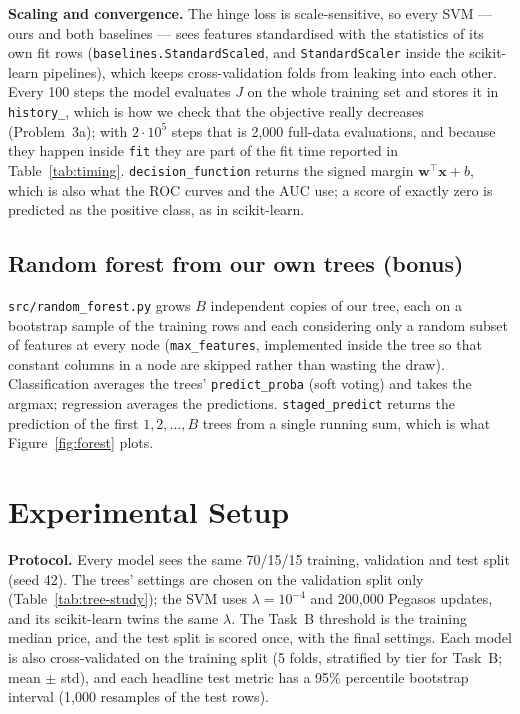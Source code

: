 \documentclass[10pt,twocolumn,a4paper]{article}
\begin{document}
\textbf{Scaling and convergence.} The hinge loss is scale-sensitive, so every
SVM --- ours and both baselines --- sees features standardised with the
statistics of its own fit rows (\texttt{baselines.StandardScaled}, and
\texttt{StandardScaler} inside the scikit-learn pipelines), which keeps
cross-validation folds from leaking into each other. Every 100 steps the model
evaluates $J$ on the whole training set and stores it in \texttt{history\_},
which is how we check that the objective really decreases (Problem~3a); with
$2\cdot10^5$ steps that is 2{,}000 full-data evaluations, and because they
happen inside \texttt{fit} they are part of the fit time reported in
Table~\ref{tab:timing}. \texttt{decision\_function} returns the signed margin
$\mathbf{w}^{\top}\mathbf{x}+b$, which is also what the ROC curves and the AUC
use; a score of exactly zero is predicted as the positive class, as in
scikit-learn.

\subsection{Random forest from our own trees (bonus)}
\texttt{src/random\_forest.py} grows $B$ independent copies of our tree, each
on a bootstrap sample of the training rows and each considering only a random
subset of features at every node (\texttt{max\_features}, implemented inside
the tree so that constant columns in a node are skipped rather than wasting
the draw). Classification averages the trees' \texttt{predict\_proba} (soft
voting) and takes the argmax; regression averages the predictions.
\texttt{staged\_predict} returns the prediction of the first $1,2,\dots,B$
trees from a single running sum, which is what Figure~\ref{fig:forest} plots.

\section{Experimental Setup}
\label{sec:setup}
\textbf{Protocol.} Every model sees the same 70/15/15 training, validation
and test split (seed 42). The trees' settings are chosen on the validation
split only (Table~\ref{tab:tree-study}); the SVM uses $\lambda=10^{-4}$ and
200{,}000 Pegasos updates, and its scikit-learn twins the same $\lambda$. The
Task~B threshold is the training median price, and the test split is scored
once, with the final settings. Each model is also cross-validated
on the training split (5 folds, stratified by tier for Task~B; mean $\pm$
std), and each headline test metric has a 95\% percentile bootstrap interval
(1{,}000 resamples of the test rows).
\end{document}
